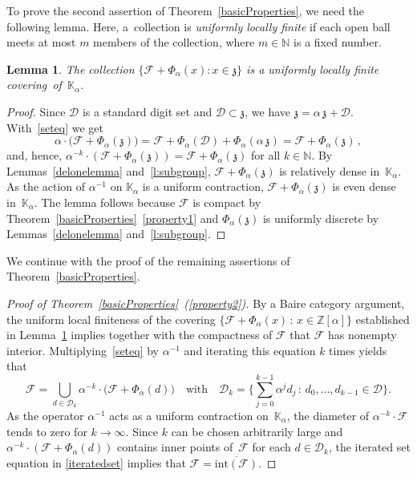\documentclass[12pt]{amsart}
\newtheorem{lemma}{Lemma}[section]
\theoremstyle{definition}
\theoremstyle{remark}
\numberwithin{equation}{section}
\begin{document}
To prove the second assertion of Theorem~\ref{basicProperties}, we need the following lemma.
Here, a~collection is \emph{uniformly locally finite} if each open ball meets at most $m$ members of the collection, where $m \in \mathbb{N}$ is a fixed number.

\begin{lemma}\label{lfcovering}
The collection $\{\mathcal{F} + \Phi_\alpha(x): x \in \mathfrak{z}\}$ is a uniformly locally finite covering~of~$\mathbb{K}_\alpha$.
\end{lemma}

\begin{proof}
Since $\mathcal{D}$ is a standard digit set and $\mathcal{D} \subset \mathfrak{z}$, we have $\mathfrak{z} = \alpha\, \mathfrak{z} + \mathcal{D}$.
With~\eqref{seteq} we get
\[
\alpha \cdot \big(\mathcal{F} + \Phi_\alpha(\mathfrak{z})\big) = \mathcal{F} + \Phi_\alpha(\mathcal{D}) + \Phi_\alpha(\alpha\, \mathfrak{z}) = \mathcal{F} + \Phi_\alpha(\mathfrak{z})\,,
\]
and, hence, $\alpha^{-k} \cdot (\mathcal{F} + \Phi_\alpha(\mathfrak{z})) = \mathcal{F} + \Phi_\alpha(\mathfrak{z})$ for all $k\in \mathbb{N}$.
By Lemmas~\ref{delonelemma} and~\ref{l:subgroup}, $\mathcal{F} + \Phi_\alpha(\mathfrak{z})$ is relatively dense in~$\mathbb{K}_\alpha$.
As the action of $\alpha^{-1}$ on $\mathbb{K}_\alpha$ is a uniform contraction, $\mathcal{F} + \Phi_\alpha(\mathfrak{z})$ is even dense in~$\mathbb{K}_\alpha$.
The lemma follows because $\mathcal{F}$ is compact by Theorem~\ref{basicProperties}~\eqref{property1} and $\Phi_\alpha(\mathfrak{z})$ is uniformly discrete by Lemmas~\ref{delonelemma} and~\ref{l:subgroup}.
\end{proof}

We continue with the proof of the remaining assertions of Theorem~\ref{basicProperties}.

\begin{proof}[Proof of Theorem~\ref{basicProperties}~(\ref{property2})]
By a Baire category argument, the uniform local finiteness of the covering $\{\mathcal{F} + \Phi_\alpha(x) \,:\, x \in \mathbb{Z}[\alpha]\}$ established in Lemma~\ref{lfcovering} implies together with the compactness of $\mathcal{F}$ that $\mathcal{F}$ has nonempty interior.
Multiplying~\eqref{seteq} by $\alpha^{-1}$ and iterating this equation $k$ times yields that
\begin{equation}\label{iteratedset}
\mathcal{F} = \bigcup_{d \in \mathcal{D}_k} \alpha^{-k} \cdot \big(\mathcal{F} + \Phi_\alpha(d)\big) \quad \mbox{with} \quad  \mathcal{D}_k = \bigg\{\sum_{j=0}^{k-1} \alpha^j d_j \,:\, d_0,\ldots, d_{k-1} \in \mathcal{D}\bigg\}.
\end{equation}
As the operator $\alpha^{-1}$ acts as a uniform contraction on~$\mathbb{K}_\alpha$, the diameter of $\alpha^{-k} \cdot \mathcal{F}$ tends to zero for $k \to \infty$. Since $k$ can be chosen arbitrarily large and $\alpha^{-k} \cdot (\mathcal{F} + \Phi_\alpha(d))$ contains inner points of~$\mathcal{F}$ for each $d\in \mathcal{D}_k$, the iterated set equation in \eqref{iteratedset} implies that $\mathcal{F}=\overline{\mathrm{int}(\mathcal{F})}$.
\end{proof}
\end{document}
